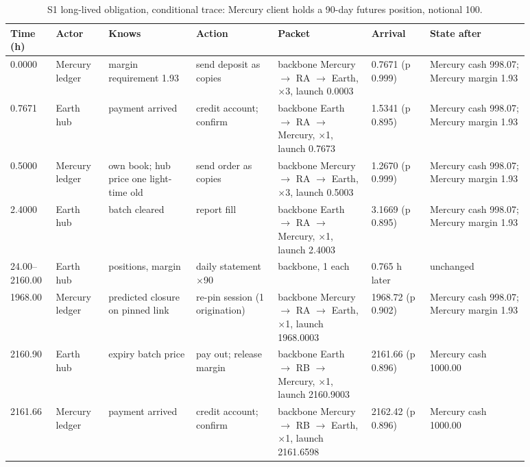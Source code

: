 {\setlength{\tabcolsep}{3pt}\begin{longtable}{@{}p{0.07\linewidth}p{0.09\linewidth}p{0.15\linewidth}p{0.14\linewidth}p{0.16\linewidth}p{0.1\linewidth}p{0.17\linewidth}@{}}
\caption{S1 long-lived obligation, conditional trace: Mercury client holds a 90-day futures position, notional 100.}\\
\toprule
Time (h) & Actor & Knows & Action & Packet & Arrival & State after \\
\midrule
\endhead
0.0000 & Mercury ledger & margin requirement 1.93 & send deposit as copies & backbone Mercury $\to$ RA $\to$ Earth, $\times$3, launch 0.0003 & 0.7671 (p 0.999) & Mercury cash 998.07; Mercury margin 1.93 \\
0.7671 & Earth hub & payment arrived & credit account; confirm & backbone Earth $\to$ RA $\to$ Mercury, $\times$1, launch 0.7673 & 1.5341 (p 0.895) & Mercury cash 998.07; Mercury margin 1.93 \\
0.5000 & Mercury ledger & own book; hub price one light-time old & send order as copies & backbone Mercury $\to$ RA $\to$ Earth, $\times$3, launch 0.5003 & 1.2670 (p 0.999) & Mercury cash 998.07; Mercury margin 1.93 \\
2.4000 & Earth hub & batch cleared & report fill & backbone Earth $\to$ RA $\to$ Mercury, $\times$1, launch 2.4003 & 3.1669 (p 0.895) & Mercury cash 998.07; Mercury margin 1.93 \\
24.00--2160.00 & Earth hub & positions, margin & daily statement $\times$90 & backbone, 1 each & 0.765 h later & unchanged \\
1968.00 & Mercury ledger & predicted closure on pinned link & re-pin session (1 origination) & backbone Mercury $\to$ RA $\to$ Earth, $\times$1, launch 1968.0003 & 1968.72 (p 0.902) & Mercury cash 998.07; Mercury margin 1.93 \\
2160.90 & Earth hub & expiry batch price & pay out; release margin & backbone Earth $\to$ RB $\to$ Mercury, $\times$1, launch 2160.9003 & 2161.66 (p 0.896) & Mercury cash 1000.00 \\
2161.66 & Mercury ledger & payment arrived & credit account; confirm & backbone Mercury $\to$ RB $\to$ Earth, $\times$1, launch 2161.6598 & 2162.42 (p 0.896) & Mercury cash 1000.00 \\
\bottomrule
\end{longtable}}

